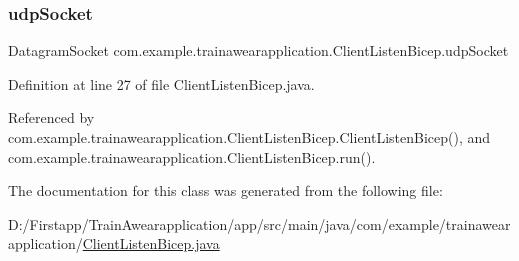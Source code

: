 \subsubsection{\texorpdfstring{udpSocket}{udpSocket}}
{\footnotesize\ttfamily Datagram\+Socket com.\+example.\+trainawearapplication.\+Client\+Listen\+Bicep.\+udp\+Socket\hspace{0.3cm}{\ttfamily [private]}}



Definition at line 27 of file Client\+Listen\+Bicep.\+java.



Referenced by com.\+example.\+trainawearapplication.\+Client\+Listen\+Bicep.\+Client\+Listen\+Bicep(), and com.\+example.\+trainawearapplication.\+Client\+Listen\+Bicep.\+run().



The documentation for this class was generated from the following file\+:\begin{DoxyCompactItemize}
\item 
D\+:/\+Firstapp/\+Train\+Awearapplication/app/src/main/java/com/example/trainawearapplication/\mbox{\hyperlink{_client_listen_bicep_8java}{Client\+Listen\+Bicep.\+java}}\end{DoxyCompactItemize}
